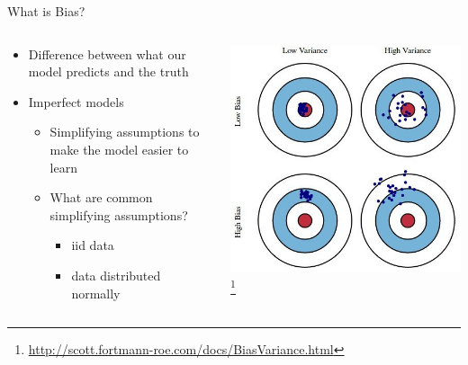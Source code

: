 \documentclass[aspectratio=169]{beamer}
\begin{document}
\begin{frame}{What is Bias?}

\begin{columns}
\begin{column}{0.5\textwidth}
\begin{itemize}
\item Difference between what our model predicts and the truth
\item Imperfect models
	\begin{itemize}
	\item Simplifying assumptions to make the model easier to learn
	\item What are common simplifying assumptions? 
	\begin{itemize}
	\item iid data 
	\item data distributed normally 
	\end{itemize}
	\end{itemize}
\end{itemize}
\end{column}
\begin{column}{0.5\textwidth}
\includegraphics[width=1\textwidth]{./lectReg/bias-and-variance.jpg}
\footnote{\url{http://scott.fortmann-roe.com/docs/BiasVariance.html}}
\end{column}
\end{columns}

\end{frame}
\end{document}
